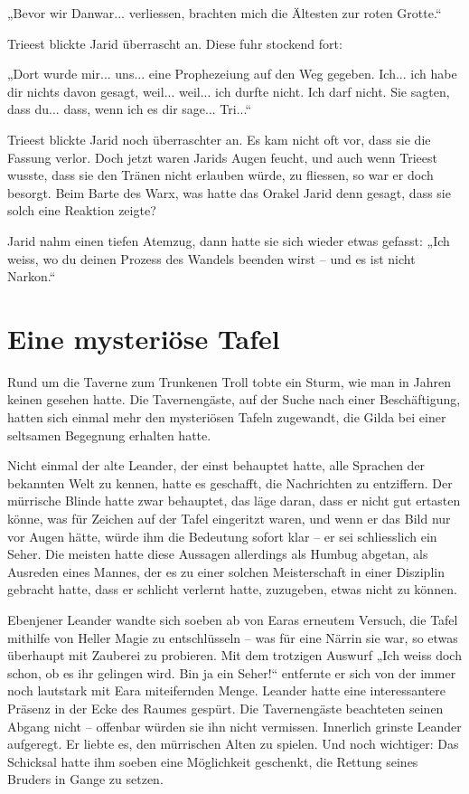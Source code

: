 „Bevor wir Danwar... verliessen, brachten mich die Ältesten zur roten Grotte.“

Trieest blickte Jarid überrascht an. Diese fuhr stockend fort:

„Dort wurde mir... uns... eine Prophezeiung auf den Weg gegeben. Ich... ich habe dir nichts davon gesagt, weil... weil... ich durfte nicht. Ich darf nicht. Sie sagten, dass du... dass, wenn ich es dir sage... Tri...“

Trieest blickte Jarid noch überraschter an. Es kam nicht oft vor, dass sie die Fassung verlor. Doch jetzt waren Jarids Augen feucht, und auch wenn Trieest wusste, dass sie den Tränen nicht erlauben würde, zu fliessen, so war er doch besorgt. Beim Barte des Warx, was hatte das Orakel Jarid denn gesagt, dass sie solch eine Reaktion zeigte?

Jarid nahm einen tiefen Atemzug, dann hatte sie sich wieder etwas gefasst: „Ich weiss, wo du deinen Prozess des Wandels beenden wirst – und es ist nicht Narkon.“





\newpage
\section{Eine mysteriöse Tafel}

Rund um die Taverne zum Trunkenen Troll tobte ein Sturm, wie man in Jahren keinen gesehen hatte. Die Tavernengäste, auf der Suche nach einer Beschäftigung, hatten sich einmal mehr den mysteriösen Tafeln zugewandt, die Gilda bei einer seltsamen Begegnung erhalten hatte.

Nicht einmal der alte Leander, der einst behauptet hatte, alle Sprachen der bekannten Welt zu kennen, hatte es geschafft, die Nachrichten zu entziffern. Der mürrische Blinde hatte zwar behauptet, das läge daran, dass er nicht gut ertasten könne, was für Zeichen auf der Tafel eingeritzt waren, und wenn er das Bild nur vor Augen hätte, würde ihm die Bedeutung sofort klar – er sei schliesslich ein Seher. Die meisten hatte diese Aussagen allerdings als Humbug abgetan, als Ausreden eines Mannes, der es zu einer solchen Meisterschaft in einer Disziplin gebracht hatte, dass er schlicht verlernt hatte, zuzugeben, etwas nicht zu können.

Ebenjener Leander wandte sich soeben ab von Earas erneutem Versuch, die Tafel mithilfe von Heller Magie zu entschlüsseln – was für eine Närrin sie war, so etwas überhaupt mit Zauberei zu probieren. Mit dem trotzigen Auswurf „Ich weiss doch schon, ob es ihr gelingen wird. Bin ja ein Seher!“ entfernte er sich von der immer noch lautstark mit Eara miteifernden Menge. Leander hatte eine interessantere Präsenz in der Ecke des Raumes gespürt. Die Tavernengäste beachteten seinen Abgang nicht – offenbar würden sie ihn nicht vermissen. Innerlich grinste Leander aufgeregt. Er liebte es, den mürrischen Alten zu spielen. Und noch wichtiger: Das Schicksal hatte ihm soeben eine Möglichkeit geschenkt, die Rettung seines Bruders in Gange zu setzen.



